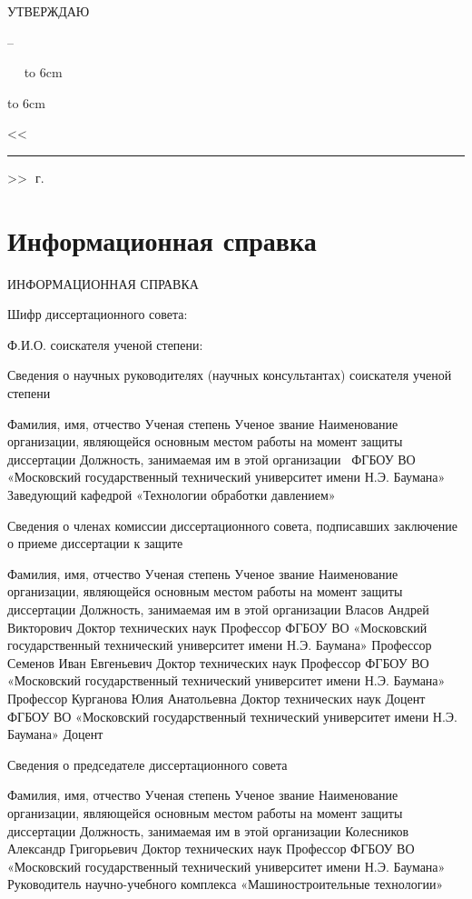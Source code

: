 
\hfill\parbox{6cm}{
	\centerline{УТВЕРЖДАЮ}
	\centerline{\leadingOrganizationHeadPos\---}
	\leadingOrganizationTitle
	
	\ktn~\leadingOrganizationHead\
	\linebreak
	{\hbox to 6cm{\hrulefill}}
	{\hbox to 6cm{<<\rule{7mm}{0.4pt}>>\hrulefill~\number\year\,г.}}}
\vspace{0.5cm}


\section{Информационная справка}


ИНФОРМАЦИОННАЯ СПРАВКА

Шифр диссертационного совета: \

Ф.И.О. соискателя ученой степени: \thesisAuthorLastName~\thesisAuthorOtherNames

Сведения о научных руководителях (научных консультантах) соискателя ученой степени

Фамилия, имя, отчество	Ученая степень	Ученое звание	Наименование организации, являющейся основным местом работы на момент защиты диссертации	Должность, занимаемая 
им в этой организации
\supervisorFio\	\supervisorRegaliaShort	ФГБОУ ВО «Московский государственный технический университет имени Н.Э. Баумана»	Заведующий кафедрой «Технологии обработки давлением»

Сведения о членах комиссии диссертационного совета, подписавших заключение о приеме диссертации к защите

Фамилия, имя, отчество	Ученая степень	Ученое звание	Наименование организации, являющейся основным местом работы на момент защиты диссертации	Должность, занимаемая 
им в этой организации
Власов Андрей Викторович	Доктор технических наук	Профессор	ФГБОУ ВО «Московский государственный технический университет имени Н.Э. Баумана»	Профессор
Семенов Иван Евгеньевич	Доктор технических наук	Профессор	ФГБОУ ВО «Московский государственный технический университет имени Н.Э. Баумана»	Профессор
Курганова Юлия Анатольевна	Доктор технических наук	Доцент	ФГБОУ ВО «Московский государственный технический университет имени Н.Э. Баумана»	Доцент

Сведения о председателе диссертационного совета

Фамилия, имя, отчество	Ученая степень	Ученое звание	Наименование организации, являющейся основным местом работы на момент защиты диссертации	Должность, занимаемая 
им в этой организации
Колесников Александр Григорьевич	Доктор технических наук	Профессор	ФГБОУ ВО «Московский государственный технический университет имени Н.Э. Баумана»	Руководитель научно-учебного комплекса «Машиностроительные технологии»

